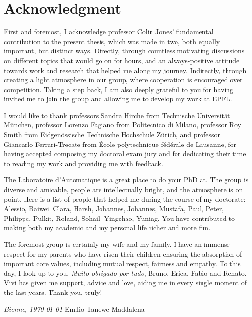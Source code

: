 \chapter*{Acknowledgment}


First and foremost, I acknowledge professor Colin Jones' fundamental contribution to the present thesis, which was made in two, both equally important, but distinct ways. Directly, through countless motivating discussions on different topics that would go on for hours, and an always-positive attitude towards work and research that helped me along my journey. Indirectly, through creating a light atmosphere in our group, where cooperation is encouraged over competition. Taking a step back, I am also deeply grateful to you for having invited me to join the group and allowing me to develop my work at EPFL. 

I would like to thank professors Sandra Hirche from Technische Universität München, professor Lorenzo Fagiano from Politecnico di Milano, professor Roy Smith from Eidgenössische Technische Hochschule Zürich, and professor Giancarlo Ferrari-Trecate from École polytechnique fédérale de Lausanne, for having accepted composing my doctoral exam jury and for dedicating their time to reading my work and providing me with feedback.

The Laboratoire d'Automatique is a great place to do your PhD at. The group is diverse and amicable, people are intellectually bright, and the atmosphere is on point. Here is a list of people that helped me during the course of my doctorate: Alessio, Baiwei, Clara, Harsh, Johannes, Johannes, Mustafa, Paul, Peter, Philippe, Pulkit, Roland, Sohail, Yingzhao, Yuning. You have contributed to making both my academic and my personal life richer and more fun.

The foremost group is certainly my wife and my family. I have an immense respect for my parents who have risen their children ensuring the absorption of important core values, including mutual respect, fairness and empathy. To this day, I look up to you. \textit{Muito obrigado por tudo}, Bruno, Erica, Fabio and Renato. Vivi has given me support, advice and love, aiding me in every single moment of the last years. Thank you, truly! 

\bigskip
 
\noindent\textit{Bienne, \today}
\hfill Emilio Tanowe Maddalena
